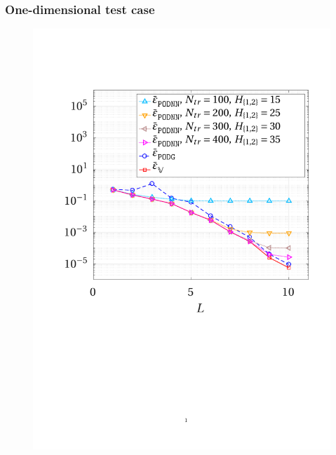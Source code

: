 \documentclass{elsarticle}
\numberwithin{equation}{section}
\theoremstyle{theorem}
\theoremstyle{definition}
\theoremstyle{remark}
\theoremstyle{proposition}
\numberwithin{figure}{section}
\begin{document}
		
		
		
	\subsubsection{One-dimensional test case}
	\label{section:One-dimensional test case}
	
		\begin{figure}[b!]
			\center
			\includegraphics[scale = 0.385, trim = {1cm 9cm 1cm 3.5cm}, clip]{poisson1d_3_error_vs_rank}

\end{figure}
\end{document}

